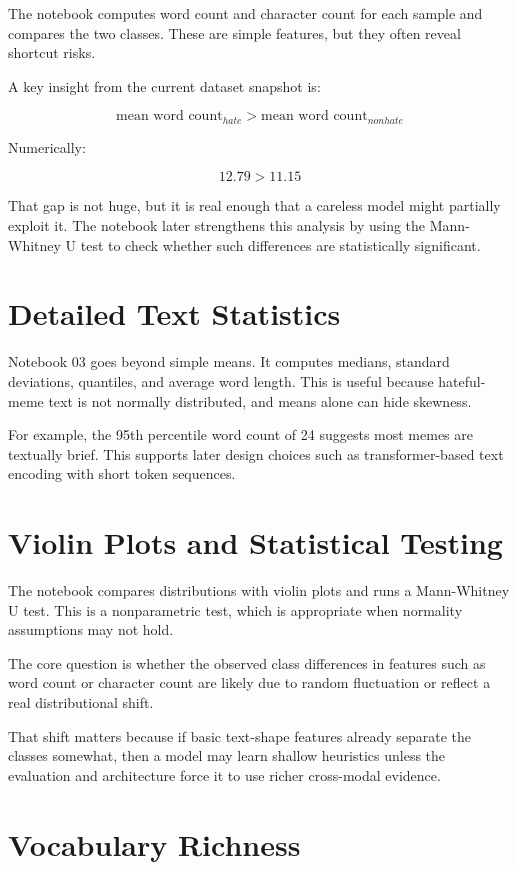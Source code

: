 \documentclass[11pt,a4paper]{report}
\begin{document}
The notebook computes word count and character count for each sample and compares the two classes. These are simple features, but they often reveal shortcut risks.

A key insight from the current dataset snapshot is:

\[
\text{mean word count}_{hate} > \text{mean word count}_{nonhate}
\]

Numerically:

\[
12.79 > 11.15
\]

That gap is not huge, but it is real enough that a careless model might partially exploit it. The notebook later strengthens this analysis by using the Mann-Whitney U test to check whether such differences are statistically significant.

\section{Detailed Text Statistics}

Notebook 03 goes beyond simple means. It computes medians, standard deviations, quantiles, and average word length. This is useful because hateful-meme text is not normally distributed, and means alone can hide skewness.

For example, the 95th percentile word count of 24 suggests most memes are textually brief. This supports later design choices such as transformer-based text encoding with short token sequences.

\section{Violin Plots and Statistical Testing}

The notebook compares distributions with violin plots and runs a Mann-Whitney U test. This is a nonparametric test, which is appropriate when normality assumptions may not hold.

The core question is whether the observed class differences in features such as word count or character count are likely due to random fluctuation or reflect a real distributional shift.

That shift matters because if basic text-shape features already separate the classes somewhat, then a model may learn shallow heuristics unless the evaluation and architecture force it to use richer cross-modal evidence.

\section{Vocabulary Richness}
\end{document}

